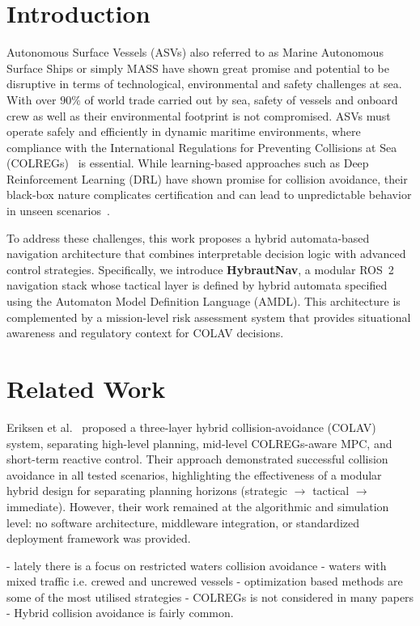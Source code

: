 \documentclass{article}
\begin{document}
\section{Introduction}
Autonomous Surface Vessels (ASVs) also referred to as Marine Autonomous Surface Ships or simply MASS have shown great promise and potential to be disruptive in terms of technological, environmental and safety challenges at sea. With over $90\%$ of world trade carried out by sea, safety of vessels and onboard crew as well as their environmental footprint is not compromised. ASVs must operate safely and efficiently in dynamic maritime environments, where compliance with the International Regulations for Preventing Collisions at Sea (COLREGs)~\cite{colregs1972} is essential. While learning-based approaches such as Deep Reinforcement Learning (DRL) have shown promise for collision avoidance, their black-box nature complicates certification and can lead to unpredictable behavior in unseen scenarios~\cite{wang2022colregs}.

To address these challenges, this work proposes a hybrid automata-based navigation architecture that combines interpretable decision logic with advanced control strategies. Specifically, we introduce \textbf{HybrautNav}, a modular ROS~2 navigation stack whose tactical layer is defined by hybrid automata specified using the Automaton Model Definition Language (AMDL). This architecture is complemented by a mission-level risk assessment system that provides situational awareness and regulatory context for COLAV decisions.

\section{Related Work}
Eriksen et al.~\cite{eriksen2020hybrid} proposed a three-layer hybrid collision-avoidance (COLAV) system, separating high-level planning, mid-level COLREGs-aware MPC, and short-term reactive control. Their approach demonstrated successful collision avoidance in all tested scenarios, highlighting the effectiveness of a modular hybrid design for separating planning horizons (strategic $\rightarrow$ tactical $\rightarrow$ immediate). However, their work remained at the algorithmic and simulation level: no software architecture, middleware integration, or standardized deployment framework was provided.

- lately there is a focus on restricted waters collision avoidance
- waters with mixed traffic i.e. crewed and uncrewed vessels
- optimization based methods are some of the most utilised strategies
- COLREGs is not considered in many papers
- Hybrid collision avoidance is fairly common.
\end{document}
